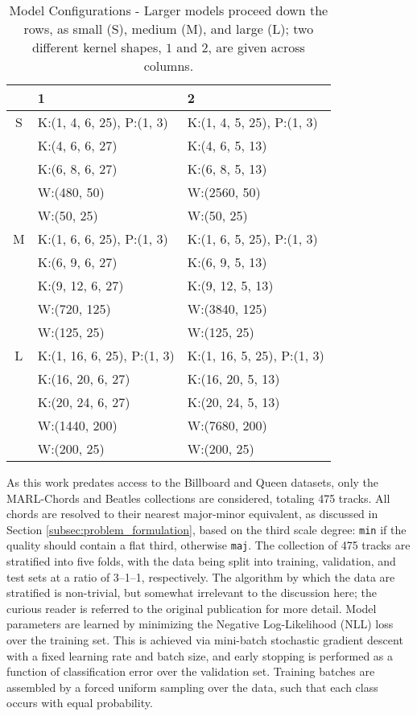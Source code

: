 \begin{table}[!t]
\renewcommand{\arraystretch}{1.4}
\caption{Model Configurations - Larger models proceed down the rows, as small (S), medium (M), and large (L); two different kernel shapes, $1$ and $2$, are given across columns.}
\label{tab:model_configs}
\centering
\begin{tabular}{c || l || l |}
 & 1 & 2 \\
\hline
 S & K:(1, 4, 6, 25), P:(1, 3)& K:(1, 4, 5, 25), P:(1, 3)\\
 &K:(4, 6, 6, 27) & K:(4, 6, 5, 13) \\
 &K:(6, 8, 6, 27) & K:(6, 8, 5, 13) \\
 &W:(480, 50)  & W:(2560, 50)\\
 &W:(50, 25)  & W:(50, 25)\\
\hline
 M & K:(1, 6, 6, 25), P:(1, 3)& K:(1, 6, 5, 25), P:(1, 3)\\
 &K:(6, 9, 6, 27) & K:(6, 9, 5, 13) \\
 &K:(9, 12, 6, 27) & K:(9, 12, 5, 13) \\
 &W:(720, 125)  & W:(3840, 125)\\
 &W:(125, 25)  & W:(125, 25)\\
\hline
 L & K:(1, 16, 6, 25), P:(1, 3)& K:(1, 16, 5, 25), P:(1, 3)\\
 &K:(16, 20, 6, 27) & K:(16, 20, 5, 13) \\
 &K:(20, 24, 6, 27) & K:(20, 24, 5, 13) \\
 &W:(1440, 200)  & W:(7680, 200)\\
 &W:(200, 25)  & W:(200, 25)\\
\hline
\end{tabular}
\end{table}


As this work predates access to the Billboard and Queen datasets, only the MARL-Chords and Beatles collections are considered, totaling 475 tracks.
All chords are resolved to their nearest major-minor equivalent, as discussed in Section \ref{subsec:problem_formulation}, based on the third scale degree: \texttt{min} if the quality should contain a flat third, otherwise \texttt{maj}.
The collection of 475 tracks are stratified into five folds, with the data being split into training, validation, and test sets at a ratio of 3--1--1, respectively.
The algorithm by which the data are stratified is non-trivial, but somewhat irrelevant to the discussion here; the curious reader is referred to the original publication for more detail.
Model parameters are learned by minimizing the Negative Log-Likelihood (NLL) loss over the training set.
This is achieved via mini-batch stochastic gradient descent with a fixed learning rate and batch size, and early stopping is performed as a function of classification error over the validation set.
Training batches are assembled by a forced uniform sampling over the data, such that each class occurs with equal probability.

